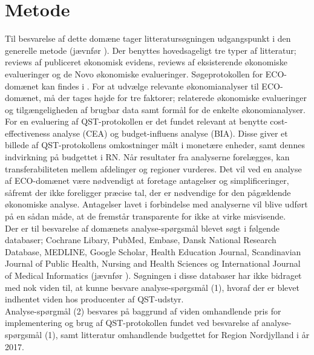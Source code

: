 \section{Metode}
Til besvarelse af dette domæne tager litteratursøgningen udgangspunkt i den generelle metode (jævnfør ). Der benyttes hovedsageligt tre typer af litteratur; reviews af publiceret økonomisk evidens, reviews af eksisterende økonomiske evalueringer og de Novo økonomiske evalueringer. Søgeprotokollen for ECO-domænet kan findes i . For at udvælge relevante økonomianalyser til ECO-domænet, må der tages højde for tre faktorer; relaterede økonomiske evalueringer og tilgængeligheden af brugbar data samt formål for de enkelte økonomianalyser. \citep{HTAcore} For en evaluering af QST-protokollen er det fundet relevant at benytte cost-effectiveness analyse (CEA) og budget-influens analyse (BIA). Disse giver et billede af QST-protokollens omkostninger målt i monetære enheder, samt dennes indvirkning på budgettet i RN. Når resultater fra analyserne forelægges, kan transferabiliteten mellem afdelinger og regioner vurderes. Det vil ved en analyse af ECO-domænet være nødvendigt at foretage antagelser og simplificeringer, såfremt der ikke foreligger præcise tal, der er nødvendige for den pågældende økonomiske analyse. Antagelser lavet i forbindelse med analyserne vil blive udført på en sådan måde, at de fremstår transparente for ikke at virke misvisende. \\
Der er til besvarelse af domænets analyse-spørgsmål blevet søgt i følgende databaser; Cochrane Libary, PubMed, Embase, Dansk National Research Database, MEDLINE, Google Scholar, Health Education Journal, Scandinavian Journal of Public Health, Nursing and Health Sciences og International Journal of Medical Informatics (jævnfør ). Søgningen i disse databaser har ikke bidraget med nok viden til, at kunne besvare analyse-spørgsmål (1), hvoraf der er blevet indhentet viden hos producenter af QST-udstyr. \\
Analyse-spørgmål (2) besvares på baggrund af viden omhandlende pris for implementering og brug af QST-protokollen fundet ved besvarelse af analyse-spørgsmål (1), samt litteratur omhandlende budgettet for Region Nordjylland i år 2017. 

